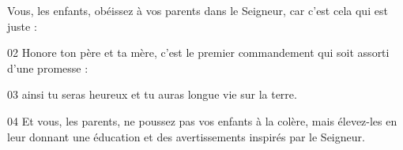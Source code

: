 Vous, les enfants, obéissez à vos parents dans le Seigneur, car c’est cela qui est juste :

02 Honore ton père et ta mère, c’est le premier commandement qui soit assorti d’une promesse :

03 ainsi tu seras heureux et tu auras longue vie sur la terre.

04 Et vous, les parents, ne poussez pas vos enfants à la colère, mais élevez-les en leur donnant une éducation et des avertissements inspirés par le Seigneur.
